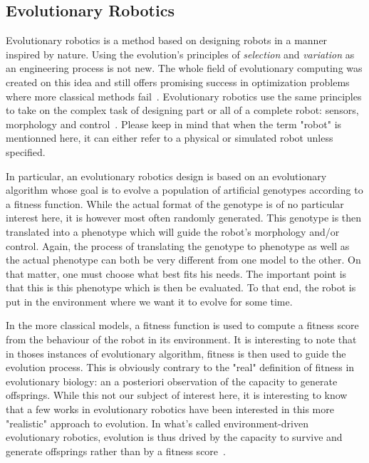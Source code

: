   \subsection{Evolutionary Robotics}

    Evolutionary robotics is a method based on designing robots in a manner inspired by nature. Using the evolution's principles of \emph{selection} and \emph{variation} as an engineering process is not new. The whole field of evolutionary computing was created on this idea and still offers promising success in optimization problems where more classical methods fail~\parencite{Holland1975, Goldberg1989, Eiben2003}. Evolutionary robotics use the same principles to take on the complex task of designing part or all of a complete robot: sensors, morphology and control~\parencite{Nolfi2000, Doncieux2015a}. Please keep in mind that when the term "robot" is mentionned here, it can either refer to a physical or simulated robot unless specified.


    In particular, an evolutionary robotics design is based on an evolutionary algorithm whose goal is to evolve a population of artificial genotypes according to a fitness function. While the actual format of the genotype is of no particular interest here, it is however most often randomly generated. This genotype is then translated into a phenotype which will guide the robot's morphology and/or control. Again, the process of translating the genotype to phenotype as well as the actual phenotype can both be very different from one model to the other. On that matter, one must choose what best fits his needs. The important point is that this is this phenotype which is then be evaluated. To that end, the robot is put in the environment where we want it to evolve for some time. 
    
    In the more classical models, a fitness function is used to compute a fitness score from the behaviour of the robot in its environment. It is interesting to note that in thoses instances of evolutionary algorithm, fitness is then used to guide the evolution process. This is obviously contrary to the "real" definition of fitness in evolutionary biology: an a posteriori observation of the capacity to generate offsprings. While this not our subject of interest here, it is interesting to know that a few works in evolutionary robotics have been interested in this more "realistic" approach to evolution. In what's called environment-driven evolutionary robotics, evolution is thus drived by the capacity to survive and generate offsprings rather than by a fitness score~\parencite{Ray1991, Bianco2004, Bredeche2010}.

